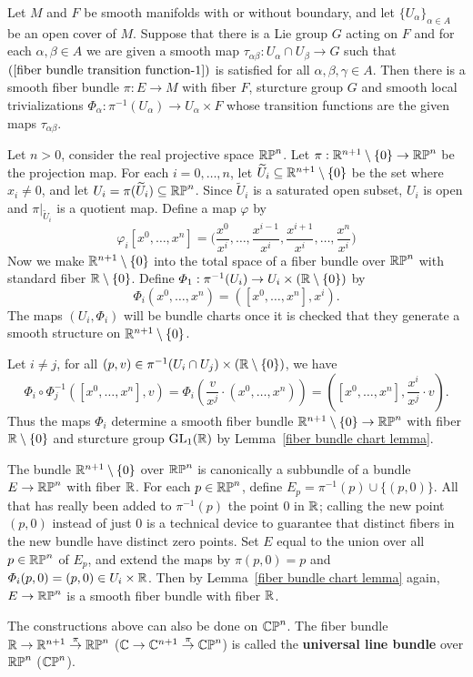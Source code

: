 \begin{theorem}\label{fiber bundle construct Lie group}
Let $M$ and $F$ be smooth manifolds with or without boundary, and let $\{U_\alpha\}_{\alpha\in A}$ be an open cover of $M$. Suppose that there is a Lie group $G$ acting on $F$ and for each $\alpha,\beta\in A$ we are 
given a smooth map $\tau_{\alpha\beta}:U_{\alpha}\cap U_{\beta}\to G$ such that $(\ref{fiber bundle transition function-1})$ is satisfied for all $\alpha,\beta,\gamma\in A$. Then 
there is a smooth fiber bundle $\pi:E\to M$ with fiber $F$, sturcture group $G$ and smooth local trivializations $\varPhi_\alpha:\pi^{-1}(U_\alpha)\to U_\alpha\times F$ 
whose transition functions are the given maps $\tau_{\alpha\beta}$.
\end{theorem}
\begin{example}
Let $n>0$, consider the real projective space $\mathbb{RP}^n$. Let $\pi:\mathbb{R}^{n+1}\setminus\{0\}\to\mathbb{RP}^n$ be the projection map. 
For each $i=0,\dots,n$, let $\widetilde{U}_i\subseteq\mathbb{R}^{n+1}\setminus\{0\}$ be the set where $x_i\neq 0$, and let 
$U_i=\pi(\widetilde{U}_i)\subseteq\mathbb{RP}^n$. Since $\widetilde{U}_i$ is a saturated open subset, $U_i$ is open and $\pi|_{\widetilde{U}_i}$ is a 
quotient map. Define a map $\varphi$ by
\[\varphi_i[x^0,\dots,x^{n}]=\Big(\frac{x^0}{x^i},\dots,\frac{x^{i-1}}{x^i},\frac{x^{i+1}}{x^i},\dots,\frac{x^{n}}{x^i}\Big)\]
Now we make $\mathbb{R}^{n+1}\setminus\{0\}$ into the total space of a fiber bundle over $\mathbb{RP}^n$ with standard fiber $\mathbb{R}\setminus\{0\}$. 
Define $\varPhi_1:\pi^{-1}(U_i)\to U_i\times(\mathbb{R}\setminus\{0\})$ by 
\[\varPhi_i(x^0,\dots,x^n)=([x^0,\dots,x^n],x^i).\]
The maps $(U_i,\varPhi_i)$ will be bundle charts once it is checked that they generate a smooth structure on $\mathbb{R}^{n+1}\setminus\{0\}$.\par
Let $i\neq j$, for all $(p,v)\in\pi^{-1}(U_i\cap U_j)\times(\mathbb{R}\setminus\{0\})$, we have 
\[\varPhi_i\circ\varPhi_j^{-1}([x^0,\dots,x^n],v)=\varPhi_i(\frac{v}{x^j}\cdot(x^0,\dots,x^n))=([x^0,\dots,x^n],\frac{x^i}{x^j}\cdot v).\]
Thus the maps $\varPhi_i$ determine a smooth fiber bundle $\mathbb{R}^{n+1}\setminus\{0\}\to\mathbb{RP}^n$ with fiber $\mathbb{R}\setminus\{0\}$ and sturcture group $\mathrm{GL}_1(\mathbb{R})$ by Lemma~\ref{fiber bundle chart lemma}.\par
The bundle $\mathbb{R}^{n+1}\setminus\{0\}$ over $\mathbb{RP}^n$ is canonically a subbundle of a
bundle $E\to\mathbb{RP}^n$ with fiber $\mathbb{R}$. For each $p\in\mathbb{RP}^n$, define $E_p=\pi^{-1}(p)\cup\{(p,0)\}$. All that has really been added to $\pi^{-1}(p)$ 
the point $0$ in $\mathbb{R}$; calling the new point $(p,0)$ instead of just $0$ is a technical 
device to guarantee that distinct fibers in the new bundle have distinct zero points. Set $E$ equal to the union over all $p\in\mathbb{RP}^n$ of $E_p$, and extend the maps by $\pi(p,0)=p$ 
and $\varPhi_i(p,0)=(p,0)\in U_i\times\mathbb{R}$. Then by Lemma~\ref{fiber bundle chart lemma} again, $E\to\mathbb{RP}^n$ is a smooth fiber bundle with fiber $\mathbb{R}$.\par
The constructions above can also be done on $\mathbb{CP}^n$. The fiber bundle $\mathbb{R}\to\mathbb{R}^{n+1}\stackrel{\pi}{\to}\mathbb{RP}^n$ ($\mathbb{C}\to\mathbb{C}^{n+1}\stackrel{\pi}{\to}\mathbb{CP}^n$) is called the \textbf{universal line bundle} over $\mathbb{RP}^n$ 
($\mathbb{CP}^n$).
\end{example}
